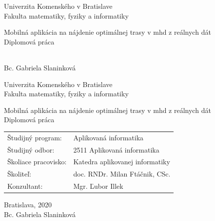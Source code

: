 \documentclass[12pt, oneside]{book}
\def\mfrok{2020}
\def\mfnazov{Mobilná aplikácia na nájdenie optimálnej trasy v mhd z reálnych dát}
\def\mftyp{Diplomová práca}
\def\mfautor{Bc. Gabriela Slaninková}
\def\mfskolitel{doc. RNDr. Milan Ftáčnik, CSc.}
\def\mfkonzultant{Mgr. Ľubor Illek }
\def\mfmiesto{Bratislava, \mfrok}
\def\mfodbor{2511 Aplikovaná informatika}
\def\program{ Aplikovaná informatika }
\def\mfpracovisko{ Katedra aplikovanej informatiky }
\begin{document}
     
\frontmatter


\thispagestyle{empty}

\begin{center}
\sc\large
Univerzita Komenského v Bratislave\\
Fakulta matematiky, fyziky a informatiky

\vfill

{\LARGE\mfnazov}\\
\mftyp
\end{center}

\vfill

{\sc\large 
\noindent \mfrok\\
\mfautor
}

\eject %


\thispagestyle{empty}
\noindent

\begin{center}
\sc  
\large
Univerzita Komenského v Bratislave\\
Fakulta matematiky, fyziky a informatiky

\vfill

{\LARGE\mfnazov}\\
\mftyp
\end{center}

\vfill

\noindent
\begin{tabular}{ll}
Študijný program: & \program \\
Študijný odbor: & \mfodbor \\
Školiace pracovisko: & \mfpracovisko \\
Školiteľ: & \mfskolitel \\
Konzultant: & \mfkonzultant \\
\end{tabular}

\vfill


\noindent \mfmiesto\\
\mfautor

\eject %




\end{document}
